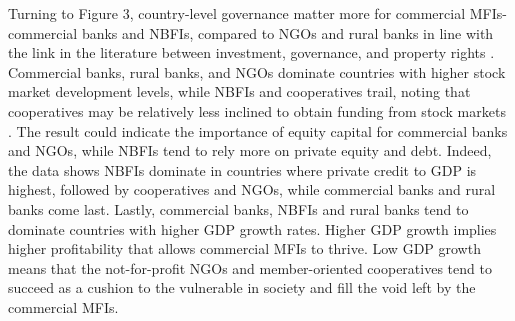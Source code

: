 \documentclass[a4paper,nobind]{templates/ociamthesis}
\begin{document}
Turning to Figure 3, country-level governance matter more for commercial MFIs- commercial banks and NBFIs, compared to NGOs and rural banks in line with the link in the literature between investment, governance, and property rights \autocite{claessens2003financial}. Commercial banks, rural banks, and NGOs dominate countries with higher stock market development levels, while NBFIs and cooperatives trail, noting that cooperatives may be relatively less inclined to obtain funding from stock markets \autocite{porter1987economic}. The result could indicate the importance of equity capital for commercial banks and NGOs, while NBFIs tend to rely more on private equity and debt. Indeed, the data shows NBFIs dominate in countries where private credit to GDP is highest, followed by cooperatives and NGOs, while commercial banks and rural banks come last. Lastly, commercial banks, NBFIs and rural banks tend to dominate countries with higher GDP growth rates. Higher GDP growth implies higher profitability that allows commercial MFIs to thrive. Low GDP growth means that the not-for-profit NGOs and member-oriented cooperatives tend to succeed as a cushion to the vulnerable in society and fill the void left by the commercial MFIs.

\newpage
\end{document}
